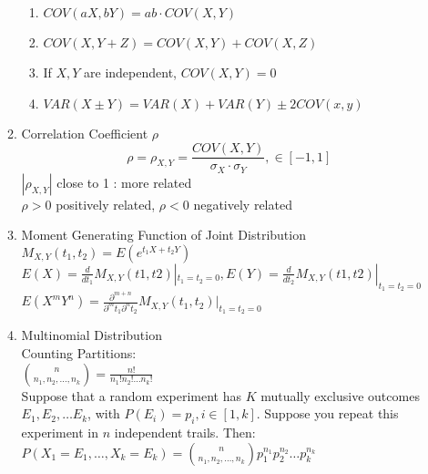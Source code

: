 \documentclass[10pt]{article}
\begin{document}
\begin{multicols}{2}
\begin{enumerate}
\begin{enumerate}
\begin{enumerate}
					\item $COV(aX,bY) = ab\cdot COV(X,Y)$
					\item $COV(X,Y+Z) = COV(X,Y) + COV(X,Z)$
					\item If $X, Y$ are independent, $COV(X,Y) = 0$
					\item $VAR(X\pm Y) = VAR(X) + VAR(Y) \pm 2COV(x,y)$
				\end{enumerate}
				\item Correlation Coefficient $\rho$\\
				$$\rho = \rho_{X,Y}= \frac{COV(X,Y)}{\sigma_X \cdot \sigma_Y}, \in [-1,1]$$
				$|\rho_{X,Y}|$ close to 1 : more related\\
				$\rho > 0$ positively related, $\rho < 0$ negatively related
				\item Moment Generating Function of Joint Distribution
				$M_{X,Y}(t_1, t_2) = E(e^{t_1X + t_2Y})$\\
				$E(X)=\frac{d}{dt_1}M_{X,Y}(t1,t2)|_{t_1=t_2=0}, E(Y) = \frac{d}{dt_2}M_{X,Y}(t1,t2)|_{t_1=t_2=0}$\\
				$E(X^mY^n) = \frac{\partial^{m+n}}{\partial^mt_1\partial^nt_2}M_{X,Y}(t_1, t_2)|_{t_1=t_2=0}$\\
				\item Multinomial Distribution\\
				Counting Partitions:\\
				${n \choose {n_1, n_2, \dots , n_k}} =  \frac{n!}{n_1!n_2! \dots n_k!}$\\
				Suppose that a random experiment has $K$ mutually exclusive outcomes $E_1, E_2, \dots E_k$, with $P(E_i) = p_i , i \in [1,k]$. Suppose you repeat this experiment in $n$ independent trails. Then:\\
				$P(X_1 = E_1, \dots , X_k = E_k) = {n \choose {n_1, n_2, \dots , n_k}}p_1^{n_1}p_2^{n_2} \dots p_k^{n_k}$
			\end{enumerate}
		\end{enumerate}
		\newpage
	\end{multicols}
\end{document}
